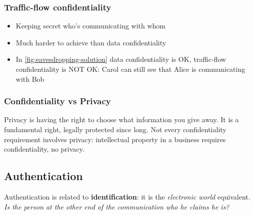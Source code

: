 \documentclass[11pt,british,faculty=ea,layout=titlefont,underline=false,titleUppercase=true,titleUnderline=true,hidelinks]{ugent2016-report}
\begin{document}
            \subsubsection{Traffic-flow confidentiality} \label{subsub:traffic-flow-confidentiality}
                \begin{itemize}
                    \item Keeping secret who's communicating with whom
                    \item Much harder to achieve than data confidentiality
                    \item In \figurename{} \ref{fig:eavesdropping-solution} data confidentiality is OK, traffic-flow confidentiality is NOT OK: Carol can still see that Alice is communicating with Bob
                \end{itemize}

            \subsubsection{Confidentiality vs Privacy} \label{subsub:confidentiality-vs-privacy}
                Privacy is having the right to choose what information you give away.
                It is a fundamental right, legally protected since long.
                Not every confidentiality requirement involves privacy: intellectual property in a business requires confidentiality, no privacy.

        \subsection{Authentication} \label{sub:authentication}
            Authentication is related to \textbf{identification}: it is the \textit{electronic world} equivalent. \textit{Is the person at the other end of the communication who he claims he is?}
\end{document}
